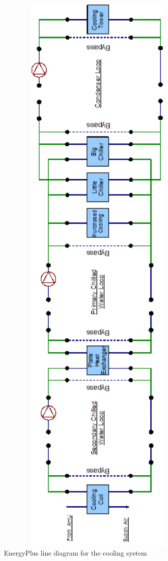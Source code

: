 \begin{figure}[hbtp] %
\centering
\includegraphics[width=0.9\textwidth, height=0.9\textheight, keepaspectratio=true]{media/image089.png}
\caption{EnergyPlus line diagram for the cooling system \protect \label{fig:energyplus-line-diagram-for-the-cooling}}
\end{figure}

